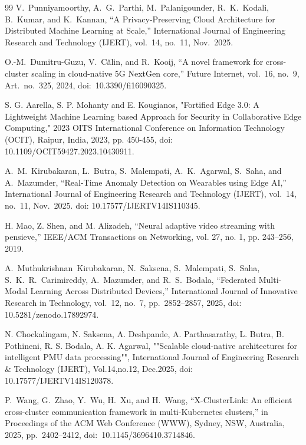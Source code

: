 \documentclass[conference]{IEEEtran}
\begin{document}
\begin{thebibliography}{99}
V.~Punniyamoorthy, A.~G.~Parthi, M.~Palanigounder, R.~K.~Kodali, B.~Kumar, and K.~Kannan,
``A Privacy-Preserving Cloud Architecture for Distributed Machine Learning at Scale,''
International Journal of Engineering Research and Technology (IJERT), vol.~14, no.~11, Nov.~2025.

O.-M.~Dumitru-Guzu, V.~C\u{a}lin, and R.~Kooij,
``A novel framework for cross-cluster scaling in cloud-native 5G NextGen core,''
Future Internet,
vol.~16, no.~9, Art.~no.~325, 2024,
doi:~10.3390/fi16090325.

S. G. Aarella, S. P. Mohanty and E. Kougianos, "Fortified Edge 3.0: A Lightweight Machine Learning based Approach for Security in Collaborative Edge Computing," 2023 OITS International Conference on Information Technology (OCIT), Raipur, India, 2023, pp. 450-455, doi: 10.1109/OCIT59427.2023.10430911.

A.~M.~Kirubakaran, L.~Butra, S.~Malempati, A.~K.~Agarwal, S.~Saha, and A.~Mazumder,
``Real-Time Anomaly Detection on Wearables using Edge AI,'' International Journal of Engineering Research and Technology (IJERT), vol.~14, no.~11, Nov.~2025. doi: 10.17577/IJERTV14IS110345.

H. Mao, Z. Shen, and M. Alizadeh, “Neural adaptive video streaming with pensieve,” IEEE/ACM Transactions on Networking, vol. 27, no. 1, pp. 243–256, 2019.

A.~Muthukrishnan~Kirubakaran, N.~Saksena, S.~Malempati, S.~Saha, 
S.~K.~R.~Carimireddy, A.~Mazumder, and R.~S.~Bodala,
“Federated Multi-Modal Learning Across Distributed Devices,” 
International Journal of Innovative Research in Technology, 
vol.~12, no.~7, pp.~2852–2857, 2025, doi: 10.5281/zenodo.17892974.

N. Chockalingam, N. Saksena, A. Deshpande, A. Parthasarathy, L. Butra, B. Pothineni, R. S. Bodala, A. K. Agarwal, ""Scalable cloud-native architectures for intelligent PMU data processing"", International Journal of Engineering Research \& Technology (IJERT), Vol.14,no.12, Dec.2025, doi: 10.17577/IJERTV14IS120378.

P.~Wang, G.~Zhao, Y.~Wu, H.~Xu, and H.~Wang,
``X-ClusterLink: An efficient cross-cluster communication framework in multi-Kubernetes clusters,''
in Proceedings of the ACM Web Conference (WWW), 
Sydney, NSW, Australia, 2025, pp.~2402--2412,
doi:~10.1145/3696410.3714846.


\end{thebibliography}
\end{document}
